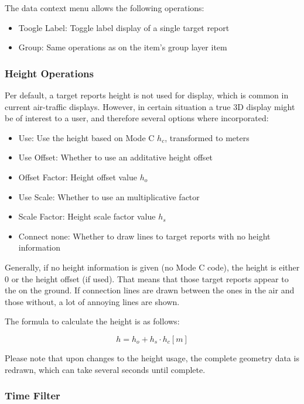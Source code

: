 {The data context menu allows the following operations:

\begin{itemize}
 \item Toogle Label: Toggle label display of a single target report
 \item Group: Same operations as on the item's group layer item
\end{itemize}

\subsubsection{Height Operations}

Per default, a target reports height is not used for display, which is common in current air-traffic displays. However, in certain situation a true 3D display might be of interest to a user, and therefore several options where incorporated:

\begin{itemize}
 \item Use: Use the height based on Mode C $h_c$, transformed to meters
 \item Use Offset: Whether to use an additative height offset
 \item Offset Factor: Height offset value $h_o$
 \item Use Scale: Whether to use an multiplicative factor
 \item Scale Factor: Height scale factor value $h_s$
 \item Connect none: Whether to draw lines to target reports with no height information
\end{itemize}

Generally, if no height information is given (no Mode C code), the height is either $0$ or the height offset (if used). That means that those target reports appear to the on the ground. If connection lines are drawn between the ones in the air and those without, a lot of annoying lines are shown.

The formula to calculate the height is as follows:

$$ h = h_o + h_s \cdot h_c [m]$$ 

Please note that upon changes to the height usage, the complete geometry data is redrawn, which can take several seconds until complete.

\subsubsection{Time Filter}

}

